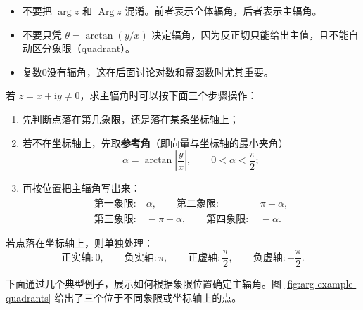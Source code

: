 \begin{jinshi}[辐角最容易出错的地方]
\begin{itemize}
    \item 不要把 $\arg z$ 和 $\operatorname{Arg}z$ 混淆。前者表示全体辐角，后者表示主辐角。
    \item 不要只凭 $\theta=\arctan(y/x)$ 决定辐角，因为反正切只能给出主值，且不能自动区分象限（quadrant）。
    \item 复数$0$没有辐角，这在后面讨论对数和幂函数时尤其重要。
\end{itemize}
\end{jinshi}

\begin{tishi}[主辐角的求法]
若 $z=x+\mathrm{i}y\neq 0$，求主辐角时可以按下面三个步骤操作：
\begin{enumerate}
    \item 先判断点落在第几象限，还是落在某条坐标轴上；
    \item 若不在坐标轴上，先取\textbf{参考角}（即向量与坐标轴的最小夹角）
    \[
    \alpha=\arctan\left|\frac{y}{x}\right|,\qquad 0<\alpha<\frac{\pi}{2};
    \]
    \item 再按位置把主辐角写出来：
    \[
    \begin{aligned}
    \text{第一象限}:&\ \alpha,\qquad
    \text{第二象限}:&\ \pi-\alpha,\\
    \text{第三象限}:&\ -\pi+\alpha,\qquad
    \text{第四象限}:&\ -\alpha.
    \end{aligned}
    \]
\end{enumerate}

若点落在坐标轴上，则单独处理：
\[
\text{正实轴}:0,\qquad
\text{负实轴}:\pi,\qquad
\text{正虚轴}:\frac{\pi}{2},\qquad
\text{负虚轴}:-\frac{\pi}{2}.
\]
\end{tishi}

下面通过几个典型例子，展示如何根据象限位置确定主辐角。图 \ref{fig:arg-example-quadrants} 给出了三个位于不同象限或坐标轴上的点。

